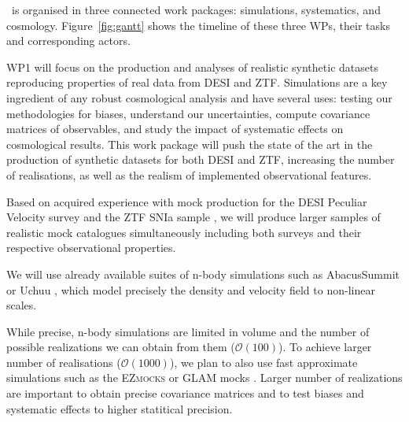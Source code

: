 
\projacro\ is organised in three connected work packages: simulations, 
systematics, and cosmology. Figure~\ref{fig:gantt} shows the timeline 
of these three WPs, their tasks and corresponding actors. 

WP1 will focus on the production and analyses of realistic synthetic datasets 
reproducing properties of real data from DESI and ZTF. 
Simulations are a key ingredient of any robust cosmological analysis and have 
several uses: testing our methodologies for biases, 
understand our uncertainties, compute covariance matrices of observables, 
and study the impact of systematic effects on cosmological results. 
This work package will push the state of the art in the production of 
synthetic datasets for both DESI and ZTF, increasing the number of realisations, 
as well as the realism of implemented observational features. 

  
    Based on acquired experience with mock production for the DESI Peculiar 
    Velocity survey \cite{bautistaDESIDR1Peculiar2025}
    and the ZTF SNIa sample \cite{carreresGrowthrateMeasurementTypeIa2023}, 
    we will produce larger samples of realistic mock catalogues simultaneously 
    including both surveys and their respective observational properties. 

    We will use already available suites of n-body simulations such as AbacusSummit 
    \cite{maksimovaABACUSSUMMITMassiveSet2021,} 
    or Uchuu \cite{ishiyamaUchuuSimulationsData2021,fernandez-garciaDESIDR2Reference2025}, 
    which model precisely the density and velocity field to non-linear scales. 
    
    While precise, n-body simulations are limited in volume and the number of possible 
    realizations we can obtain from them ($\mathcal{O}(100)$). 
    To achieve larger number of realisations ($\mathcal{O}(1000)$), we plan to also 
    use fast approximate simulations such as the \textsc{EZmocks} 
    \cite{chuangEZmocksExtendingZel2015,zhaoCompletedSDSSIVExtended2021}
    or GLAM mocks \cite{klypinDarkMatterStatistics2018,erezaUCHUUGLAMBOSSEBOSS2024}. 
    Larger number of realizations are important to obtain precise covariance matrices 
    and to test biases and systematic effects to higher statitical precision. 


